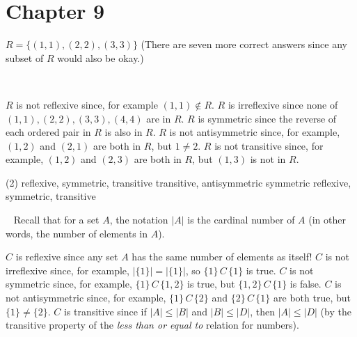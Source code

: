     \section*{Chapter 9}
\begin{Solution}{9.1}
   $R=\{ (1,1),(2,2),(3,3) \}$ (There are seven more correct answers since any subset of $R$ would also be okay.)
\end{Solution}
\begin{Solution}{9.2}
\ %
  \begin{tasks}
       \task $R$ is not reflexive since, for example $(1,1)\not\in R$.
       \task $R$ is irreflexive  since none of $(1,1), (2,2), (3,3), (4,4)$ are in $R$.
       \task $R$ is symmetric since the reverse of each ordered pair in $R$ is also in $R$.
       \task $R$ is not antisymmetric since, for example, $(1,2)$ and $(2,1)$ are both in $R$, but $1\not= 2$.
       \task $R$ is not transitive since, for example, $(1,2)$ and $(2,3)$ are both in $R$, but $(1,3)$ is not in $R$.
   \end{tasks}
\end{Solution}
\begin{Solution}{9.3}
\quad
    \begin{tasks}(2)
        \task reflexive, symmetric, transitive
        \task transitive, antisymmetric
        \task symmetric
        \task reflexive, symmetric, transitive
    \end{tasks}
\end{Solution}
\begin{Solution}{9.4}
\ %
Recall that for a set $A$, the notation $|A|$ is the cardinal number of $A$ (in other words, the number of elements in $A$).
    \begin{tasks}
       \task $C$ is reflexive since any set $A$ has the same number of elements as itself!
       \task $C$ is not irreflexive  since, for example, $|\{1\}| =  |\{1\}|$, so $\{1\}\,C\,\{1\}$ is true.
       \task $C$ is not symmetric since, for example, $\{1\}\,C\,\{1,2\}$ is true, but $\{1,2\}\,C\,\{1\}$ is false.
       \task $C$ is not antisymmetric since, for example, $\{1\}\,C\,\{2\}$ and  $\{2\}\,C\,\{1\}$ are both true, 
                       but $\{1\}\not=\{2\}$.
       \task $C$ is transitive since if $|A|\leq |B|$ and $|B|\leq |D|$, then $|A|\leq |D|$ (by the transitive property
                       of the {\itshape less than or equal to} relation for numbers).
   \end{tasks}
\end{Solution}

